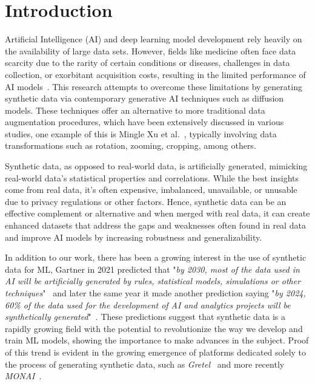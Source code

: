 \chapter{Introduction}

Artificial Intelligence (AI) and deep learning model development rely heavily on the availability of large data sets. However, fields like medicine often face data scarcity due to the rarity of certain conditions or diseases, challenges in data collection, or exorbitant acquisition costs, resulting in the limited performance of AI models~\cite{RDopportunities}. This research attempts to overcome these limitations by generating synthetic data via contemporary generative AI techniques such as diffusion models. These techniques offer an alternative to more traditional data augmentation procedures, which have been extensively discussed in various studies, one example of this is Mingle Xu et al.~\cite{augmentation_techniques}, typically involving data transformations such as rotation, zooming, cropping, among others.  
    
Synthetic data, as opposed to real-world data, is artificially generated, mimicking real-world data's statistical properties and correlations. While the best insights come from real data, it's often expensive, imbalanced, unavailable, or unusable due to privacy regulations or other factors. Hence, synthetic data can be an effective complement or alternative and when merged with real data, it can create enhanced datasets that address the gaps and weaknesses often found in real data and improve AI models by increasing robustness and generalizability.

In addition to our work, there has been a growing interest in the use of synthetic data for ML, Gartner in 2021 predicted that "\textit{by 2030, most of the data used in AI will be artificially generated by rules, statistical models, simulations or other techniques}"~\cite{gartnerMaverickResearch} and later the same year it made another prediction saying "\textit{by 2024, 60\% of the data used for the development of AI and analytics projects will be synthetically generated}"~\cite{wsjFakeMake}. These predictions suggest that synthetic data is a rapidly growing field with the potential to revolutionize the way we develop and train ML models, showing the importance to make advances in the subject. Proof of this trend is evident in the growing emergence of platforms dedicated solely to the process of generating synthetic data, such as \textit{Gretel}~\cite{gretel} and more recently \textit{MONAI}~\cite{monai}.

